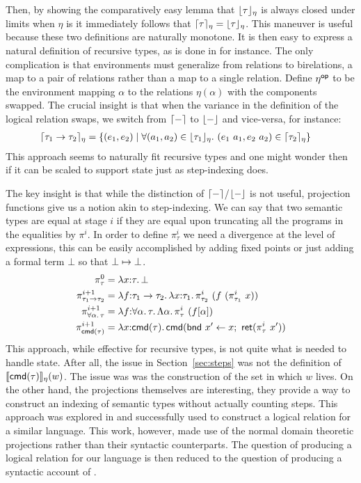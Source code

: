 Then, by showing the comparatively easy lemma that
$\lfloor \tau \rfloor_\eta$ is always closed under limits when $\eta$ is it
immediately follows that
$\lceil \tau \rceil_\eta = \lfloor \tau \rfloor_\eta$. This maneuver is
useful because these two definitions are naturally monotone.
It is then easy to express a natural definition of recursive types, as is
done in \citet{Crary:07} for instance. The only complication
is that environments must generalize from relations to birelations, a
map to a pair of relations rather than a map to a single
relation. Define $\eta^{\mathsf{op}}$ to be the environment mapping $\alpha$ to
the relations $\eta(\alpha)$ with the components swapped. The crucial
insight is that when the variance in the definition of the logical
relation swaps, we switch from $\lceil - \rceil$ to $\lfloor - \rfloor$ and
vice-versa, for instance:
\begin{align*}
  \lceil \tau_1 \to \tau_2 \rceil_\eta &=
  \{(e_1, e_2) \mid \forall (a_1, a_2) \in \lfloor \tau_1 \rfloor_\eta.
  \ (e_1\ a_1, e_2\ a_2) \in \lceil \tau_2 \rceil_\eta\}
\end{align*}
This approach seems to naturally fit recursive types and one might
wonder then if it can be scaled to support state just as step-indexing
does.

The key insight is that while the distinction of
$\lceil - \rceil$/$\lfloor - \rfloor$ is not useful, projection functions
give us a notion akin to step-indexing. We can say that two semantic
types are equal at stage $i$ if they are equal upon truncating all the
programs in the equalities by $\pi^i$. In order to define $\pi_\tau^i$
we need a divergence at the level of expressions, this can be easily
accomplished by adding fixed points or just adding a formal term
$\bot$ so that $\bot \mapsto \bot$.
\begin{align*}
  \pi_\tau^0 &= \lambda x {:} \tau.\, \bot\\
  \pi_{\tau_1 \to \tau_2}^{i + 1} &=
  \lambda f {:} \tau_1 \to \tau_2.\, \lambda x {:} \tau_1.\, \pi_{\tau_2}^i\ (f\ (\pi_{\tau_1}^i\ x))\\
  \pi_{\forall \alpha.\, \tau}^{i + 1} &=
  \lambda f {:} \forall \alpha.\, \tau.\, \Lambda \alpha.\, \pi_\tau^i\ (f[\alpha])\\
  \pi_{\mathsf{cmd}(\tau)}^{i + 1} &=
  \lambda x {:} \mathsf{cmd}(\tau).\, \mathsf{cmd}(\mathsf{bnd}\ x' \gets x;\ \mathsf{ret}(\pi_\tau^i\ x'))
\end{align*}
This approach, while effective for recursive types, is not quite what
is needed to handle state. After all, the issue in
Section~\ref{sec:steps} was not the definition of
$\llbracket \mathsf{cmd}(\tau) \rrbracket_\eta(w)$. The issue was was the construction of the
set in which $w$ lives. On the other hand, the projections themselves
are interesting, they provide a way to construct an indexing of
semantic types without actually counting steps. This approach was
explored in \citet{Birkedal:domain:10} and successfully used to
construct a logical relation for a similar language. This work,
however, made use of the normal domain theoretic projections rather
than their syntactic counterparts. The question of producing a logical
relation for our language is then reduced to the question of producing
a syntactic account of \citet{Birkedal:domain:10}.

